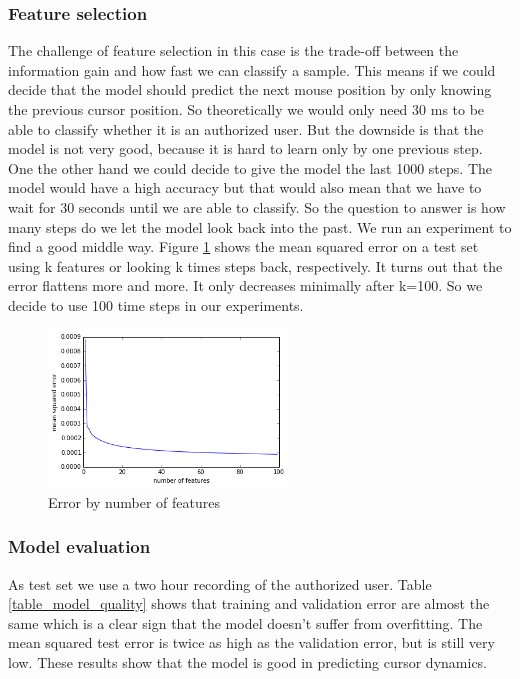 \documentclass[conference]{IEEEtran}
\begin{document}
\subsubsection{Feature selection}

The challenge of feature selection in this case is the trade-off between the information gain and how fast we can classify a sample. This means if we could decide that the model should predict the next mouse position by only knowing the previous cursor position. So theoretically we would only need 30 ms to be able to classify whether it is an authorized user. But the downside is that the model is not very good, because it is hard to learn only by one previous step. One the other hand we could decide to give the model the last 1000 steps. The model would have a high accuracy but that would also mean that we have to wait for 30 seconds until we are able to classify. So the question to answer is how many steps do we let the model look back into the past. We run an experiment to find a good middle way. Figure \ref{fig_features} shows the mean squared error on a test set using k features or looking k times steps back, respectively. It turns out that the error flattens more and more. It only decreases minimally after k=100. So we decide to use 100 time steps in our experiments.

\begin{figure}[!t]
\centering
\includegraphics[width=2.5in]{img/error_features.png}
\caption{Error by number of features}
\label{fig_features}
\end{figure}

\subsubsection{Model evaluation}
As test set we use a two hour recording of the authorized user. Table \ref{table_model_quality} shows that training and validation error are almost the same which is a clear sign that the model doesn't suffer from overfitting. The mean squared test error is twice as high as the validation error, but is still very low. These results show that the model is good in predicting cursor dynamics.
\end{document}

